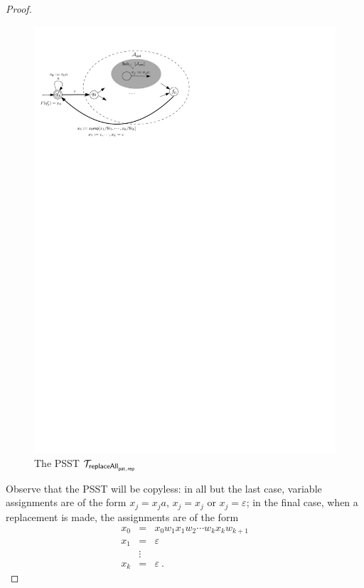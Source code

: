 \begin{proof}
        \begin{figure}[ht]
            \centering
            \includegraphics[scale=0.9]{psst-replaceall.pdf}
            \caption{The PSST $\mathcal{T}_{\mathsf{replaceAll}_{\mathsf{pat},\mathsf{rep}}}$}
            \label{fig-psst-replaceall}
        \end{figure}

        Observe that the PSST will be copyless: in all but the last case, variable assignments are of the form $x_j = x_j a$, $x_j = x_j$ or $x_j = \varepsilon$;
        in the final case, when a replacement is made, the assignments are of the form
        \[
            \begin{array}{rcl}
                x_0 &=& x_0 w_1 x_1 w_2 \cdots w_k x_k w_{k+1} \\
                x_1 &=& \varepsilon \\
                    &\vdots& \\
                x_k &=& \varepsilon \ .
            \end{array}
        \]


\end{proof}
